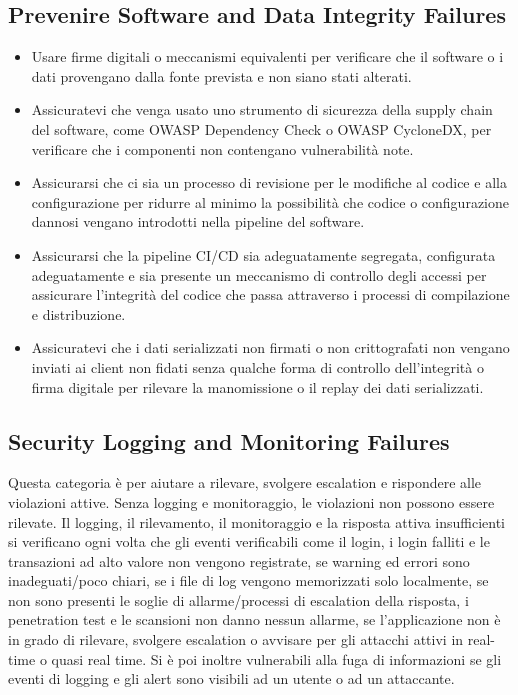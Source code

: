 \subsection{Prevenire Software and Data Integrity Failures}
\begin{itemize}
    \item Usare firme digitali o meccanismi equivalenti per verificare che il software o i dati provengano dalla fonte prevista e non siano stati alterati.
    \item Assicuratevi che venga usato uno strumento di sicurezza della supply chain del software, come OWASP Dependency Check o OWASP CycloneDX, per verificare che i componenti non contengano vulnerabilità note.
    \item Assicurarsi che ci sia un processo di revisione per le modifiche al codice e alla configurazione per ridurre al minimo la possibilità che codice o configurazione dannosi vengano introdotti nella pipeline del software.
    \item Assicurarsi che la pipeline CI/CD sia adeguatamente segregata, configurata adeguatamente e sia presente un meccanismo di controllo degli accessi per assicurare l'integrità del codice che passa attraverso i processi di compilazione e distribuzione.
    \item Assicuratevi che i dati serializzati non firmati o non crittografati non vengano inviati ai client non fidati senza qualche forma di controllo dell'integrità o firma digitale per rilevare la manomissione o il replay dei dati serializzati.  
\end{itemize}
\subsection{Security Logging and Monitoring Failures}
Questa categoria è per aiutare a rilevare, svolgere escalation e rispondere alle violazioni attive. Senza logging e monitoraggio, le violazioni non possono essere rilevate. Il logging, il rilevamento, il monitoraggio e la risposta attiva insufficienti si verificano ogni volta che gli eventi verificabili come il login, i login falliti e le transazioni ad alto valore non vengono registrate, se warning ed errori sono inadeguati/poco chiari, se i file di log vengono memorizzati solo localmente, se non sono presenti le soglie di allarme/processi di escalation della risposta, i penetration test e le scansioni non danno nessun allarme, se l’applicazione non è in grado di rilevare, svolgere escalation o avvisare per gli attacchi attivi in real-time o quasi real time. Si è poi inoltre vulnerabili alla fuga di informazioni se gli eventi di logging e gli alert sono visibili ad un utente o ad un attaccante.
